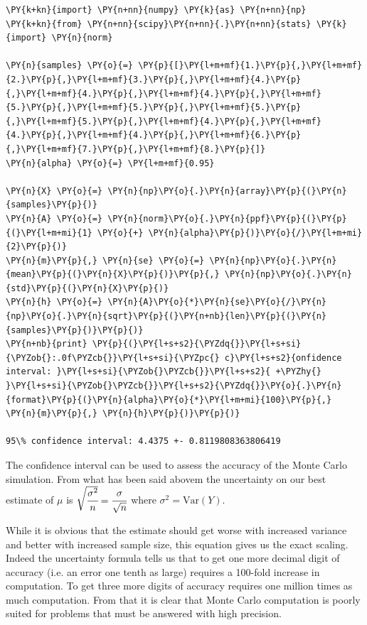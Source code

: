 \begin{codebox}[breakable, size=fbox, boxrule=1pt, pad at break*=1mm,colback=cellbackground, colframe=cellborder]
\begin{Verbatim}[commandchars=\\\{\}]
\PY{k+kn}{import} \PY{n+nn}{numpy} \PY{k}{as} \PY{n+nn}{np}
\PY{k+kn}{from} \PY{n+nn}{scipy}\PY{n+nn}{.}\PY{n+nn}{stats} \PY{k}{import} \PY{n}{norm}
	
\PY{n}{samples} \PY{o}{=} \PY{p}{[}\PY{l+m+mf}{1.}\PY{p}{,}\PY{l+m+mf}{2.}\PY{p}{,}\PY{l+m+mf}{3.}\PY{p}{,}\PY{l+m+mf}{4.}\PY{p}{,}\PY{l+m+mf}{4.}\PY{p}{,}\PY{l+m+mf}{4.}\PY{p}{,}\PY{l+m+mf}{5.}\PY{p}{,}\PY{l+m+mf}{5.}\PY{p}{,}\PY{l+m+mf}{5.}\PY{p}{,}\PY{l+m+mf}{5.}\PY{p}{,}\PY{l+m+mf}{4.}\PY{p}{,}\PY{l+m+mf}{4.}\PY{p}{,}\PY{l+m+mf}{4.}\PY{p}{,}\PY{l+m+mf}{6.}\PY{p}{,}\PY{l+m+mf}{7.}\PY{p}{,}\PY{l+m+mf}{8.}\PY{p}{]}
\PY{n}{alpha} \PY{o}{=} \PY{l+m+mf}{0.95}
	
\PY{n}{X} \PY{o}{=} \PY{n}{np}\PY{o}{.}\PY{n}{array}\PY{p}{(}\PY{n}{samples}\PY{p}{)}
\PY{n}{A} \PY{o}{=} \PY{n}{norm}\PY{o}{.}\PY{n}{ppf}\PY{p}{(}\PY{p}{(}\PY{l+m+mi}{1} \PY{o}{+} \PY{n}{alpha}\PY{p}{)}\PY{o}{/}\PY{l+m+mi}{2}\PY{p}{)}
\PY{n}{m}\PY{p}{,} \PY{n}{se} \PY{o}{=} \PY{n}{np}\PY{o}{.}\PY{n}{mean}\PY{p}{(}\PY{n}{X}\PY{p}{)}\PY{p}{,} \PY{n}{np}\PY{o}{.}\PY{n}{std}\PY{p}{(}\PY{n}{X}\PY{p}{)}
\PY{n}{h} \PY{o}{=} \PY{n}{A}\PY{o}{*}\PY{n}{se}\PY{o}{/}\PY{n}{np}\PY{o}{.}\PY{n}{sqrt}\PY{p}{(}\PY{n+nb}{len}\PY{p}{(}\PY{n}{samples}\PY{p}{)}\PY{p}{)}
\PY{n+nb}{print} \PY{p}{(}\PY{l+s+s2}{\PYZdq{}}\PY{l+s+si}{\PYZob{}:.0f\PYZcb{}}\PY{l+s+si}{\PYZpc{} c}\PY{l+s+s2}{onfidence interval: }\PY{l+s+si}{\PYZob{}\PYZcb{}}\PY{l+s+s2}{ +\PYZhy{} }\PY{l+s+si}{\PYZob{}\PYZcb{}}\PY{l+s+s2}{\PYZdq{}}\PY{o}{.}\PY{n}{format}\PY{p}{(}\PY{n}{alpha}\PY{o}{*}\PY{l+m+mi}{100}\PY{p}{,} \PY{n}{m}\PY{p}{,} \PY{n}{h}\PY{p}{)}\PY{p}{)}
	
95\% confidence interval: 4.4375 +- 0.8119808363806419
\end{Verbatim}
\end{codebox}

The confidence interval can be used to assess the accuracy of the Monte
Carlo simulation. From what has been said abovem the uncertainty on our best estimate of $\mu$ is $\sqrt{\cfrac{\sigma^2}{n}}=\cfrac{\sigma}{\sqrt{n}}$
where \(\sigma^2 = \mathrm{Var}(Y)\).

While it is obvious that the estimate should get worse with increased variance and better with increased sample size, this equation  gives us the exact 
scaling. Indeed the uncertainty formula tells us that to get one more decimal digit of accuracy (i.e. an error one tenth as large) requires a 100-fold increase in computation. To get three more digits of accuracy requires one million times as much computation. From that it is clear that Monte Carlo computation is poorly suited for problems that must be answered with high precision.

